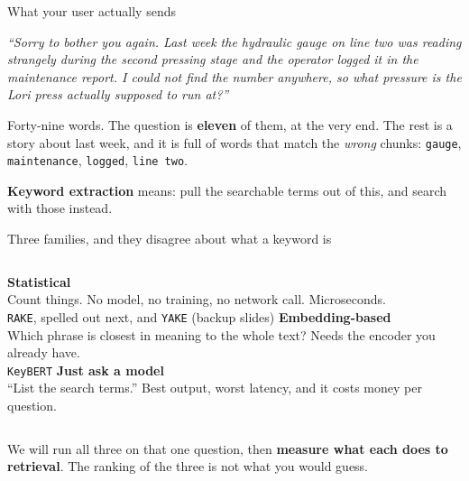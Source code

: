 \documentclass[aspectratio=169]{beamer}
\newcommand{\keybox}[1]{%
  \begin{tcolorbox}[colback=armblue!8, colframe=armblue, boxrule=0.6pt, arc=2pt]
  #1
  \end{tcolorbox}}
\newcommand{\takebox}[1]{%
  \begin{tcolorbox}[colback=paramgreen!8, colframe=paramgreen, boxrule=0.6pt, arc=2pt]
  #1
  \end{tcolorbox}}
\begin{document}
\begin{frame}{What your user actually sends}
  \vspace{0.5em}
  \begin{center}
  \begin{tcolorbox}[colback=lightbg, colframe=gray, boxrule=0.5pt, arc=2pt, width=0.94\textwidth]
    \small
    \textit{``Sorry to bother you again. Last week the hydraulic gauge on line two was
    reading strangely during the second pressing stage and the operator logged it in the
    maintenance report. I could not find the number anywhere, so what pressure is the Lori
    press actually supposed to run at?''}
  \end{tcolorbox}
  \end{center}

  \vspace{0.7em}
  Forty-nine words. The question is \textbf{eleven} of them, at the very end. The rest is a
  story about last week, and it is full of words that match the \emph{wrong} chunks:
  \texttt{gauge}, \texttt{maintenance}, \texttt{logged}, \texttt{line two}.

  \vspace{0.8em}
  \keybox{\textbf{Keyword extraction} means: pull the searchable terms out of this, and
  search with those instead.}
\end{frame}

\begin{frame}{Three families, and they disagree about what a keyword is}
  \vspace{0.8em}
  \begin{columns}[T]
      \textbf{\color{armorange}Statistical}\\[0.4em]
      {\small Count things. No model, no training, no network call. Microseconds.}\\[0.5em]
      {\small \texttt{RAKE}, spelled out next, and \texttt{YAKE} (backup slides)}
      \textbf{\color{armblue}Embedding-based}\\[0.4em]
      {\small Which phrase is closest in meaning to the whole text? Needs the encoder you
      already have.}\\[0.5em]
      {\small \texttt{KeyBERT}}
      \textbf{\color{armred}Just ask a model}\\[0.4em]
      {\small ``List the search terms.'' Best output, worst latency, and it costs money per
      question.}
  \end{columns}

  \vspace{1.2em}
  \takebox{We will run all three on that one question, then \textbf{measure what each does
  to retrieval}. The ranking of the three is not what you would guess.}
\end{frame}
\end{document}
